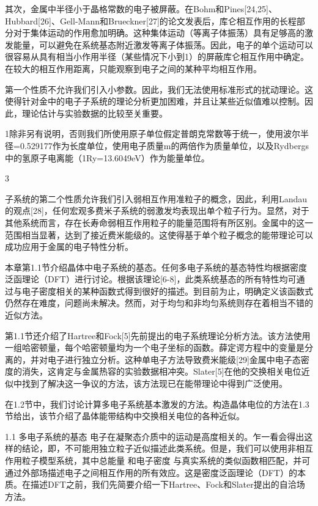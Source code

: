 其次，金属中半径小于晶格常数的电子被屏蔽。在Bohm和Pines[24,25]、Hubbard[26]、Gell-Mann和Brueckner[27]的论文发表后，库仑相互作用的长程部分对于集体运动的作用愈加明确。这种集体运动（等离子体振荡）具有足够高的激发能量，可以避免在系统基态附近激发等离子体振荡。因此，电子的单个运动可以很容易从具有相当小作用半径（某些情况下小到1）的屏蔽库仑相互作用中确定。在较大的相互作用距离，只能观察到电子之间的某种平均相互作用。

第一个性质不允许我们引入小参数。因此，我们无法使用标准形式的扰动理论。这使得针对金中的电子子系统的理论分析更加困难，并且让某些近似值难以控制。因此，理论估计与实验数据的比较至关重要。


1除非另有说明，否则我们所使用原子单位假定普朗克常数等于统一，使用波尔半径=0.529177作为长度单位，使用电子质量m的两倍作为质量单位，以及Rydbergs中的氢原子电离能（1Ry=13.6049eV）作为能量单位。


3



子系统的第二个性质允许我们引入弱相互作用准粒子的概念，因此，利用Landau的观点[28]，任何宏观多费米子系统的弱激发均表现出单个粒子行为。显然，对于其他系统而言，存在长寿命弱相互作用粒子的能量范围将有所区别。金属中的这一范围相当显著，达到了接近费米能级的。这使得基于单个粒子概念的能带理论可以成功应用于金属的电子特性分析。

本章第1.1节介绍晶体中电子系统的基态。任何多电子系统的基态特性均根据密度泛函理论（DFT）进行讨论。根据该理论[6-8]，此类系统基态的所有特性均可通过与电子密度相关的某种函数式得到很好的描述。到目前为止，明确定义该函数式仍然存在难度，问题尚未解决。然而，对于均匀和非均匀系统则存在着相当不错的近似方法。

第1.1节还介绍了Hartree和Fock[5]先前提出的电子系统理论分析方法。该方法使用一组哈密顿量，每个哈密顿量均为一个电子坐标的函数。薛定谔方程中的变量是分离的，并对电子进行独立分析。这种单电子方法导致费米能级[29]金属中电子态密度的消失，这肯定与金属热容的实验数据相冲突。Slater[5]在他的交换相关电位近似中找到了解决这一争议的方法，该方法现已在能带理论中得到广泛使用。

在1.2节中，我们讨论计算多电子系统基本激发的方法。构造晶体电位的方法在1.3节给出，该节介绍了晶体能带结构中交换相关电位的各种近似。

1.1 多电子系统的基态
电子在凝聚态介质中的运动是高度相关的。乍一看会得出这样的结论，即，不可能用独立粒子近似描述此类系统。但是，我们可以使用非相互作用粒子模型系统，其中总能量  和电子密度 与真实系统的类似函数相匹配，并可通过外部场描述电子之间相互作用的所有效应。这是密度泛函理论（DFT）的本质。在描述DFT之前，我们先简要介绍一下Hartree、Fock和Slater提出的自洽场方法。

